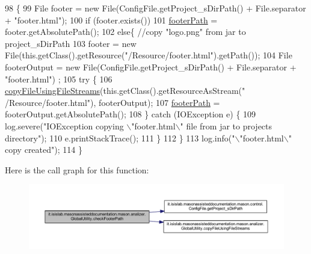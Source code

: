 \begin{DoxyCode}
98                                    \{
99         File footer = \textcolor{keyword}{new} File(ConfigFile.getProject\_sDirPath() + File.separator + \textcolor{stringliteral}{"footer.html"});
100         \textcolor{keywordflow}{if} (footer.exists())
101             \hyperlink{classit_1_1isislab_1_1masonassisteddocumentation_1_1mason_1_1analizer_1_1_global_utility_ae94176856fb4ef24dfaa70423f5fc3f9}{footerPath} = footer.getAbsolutePath();
102         \textcolor{keywordflow}{else}\{ \textcolor{comment}{//copy "logo.png" from jar to project\_sDirPath}
103             footer = \textcolor{keyword}{new} File(this.getClass().getResource(\textcolor{stringliteral}{"/Resource/footer.html"}).getPath());
104             File footerOutput = \textcolor{keyword}{new} File(ConfigFile.getProject\_sDirPath() + File.separator + \textcolor{stringliteral}{"footer.html"})
      ;
105             \textcolor{keywordflow}{try} \{
106                 \hyperlink{classit_1_1isislab_1_1masonassisteddocumentation_1_1mason_1_1analizer_1_1_global_utility_adb83aee7a7166b3826c7f3cf4ada53a9}{copyFileUsingFileStreams}(this.getClass().getResourceAsStream(\textcolor{stringliteral}{"
      /Resource/footer.html"}), footerOutput);
107                 \hyperlink{classit_1_1isislab_1_1masonassisteddocumentation_1_1mason_1_1analizer_1_1_global_utility_ae94176856fb4ef24dfaa70423f5fc3f9}{footerPath} = footerOutput.getAbsolutePath();
108             \} \textcolor{keywordflow}{catch} (IOException e) \{
109                 log.severe(\textcolor{stringliteral}{"IOException copying \(\backslash\)"footer.html\(\backslash\)" file from jar to projects directory"});
110                 e.printStackTrace();
111             \}
112         \}
113         log.info(\textcolor{stringliteral}{"\(\backslash\)"footer.html\(\backslash\)" copy created"});
114     \}
\end{DoxyCode}


Here is the call graph for this function\-:
\nopagebreak
\begin{figure}[H]
\begin{center}
\leavevmode
\includegraphics[width=350pt]{classit_1_1isislab_1_1masonassisteddocumentation_1_1mason_1_1analizer_1_1_global_utility_a461e0b0204d6c69a4126947190ca85ef_cgraph}
\end{center}
\end{figure}




